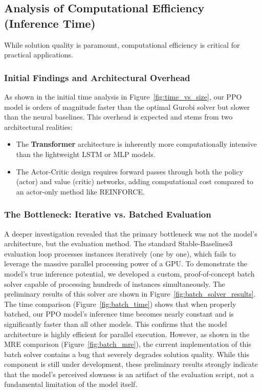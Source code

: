 \subsection{Analysis of Computational Efficiency (Inference Time)}
While solution quality is paramount, computational efficiency is critical for practical applications.

\subsubsection{Initial Findings and Architectural Overhead}
As shown in the initial time analysis in Figure~\ref{fig:time_vs_size}, our PPO model is orders of magnitude faster than the optimal Gurobi solver but slower than the neural baselines.
This overhead is expected and stems from two architectural realities:
\begin{itemize}
    \item The \textbf{Transformer} architecture is inherently more computationally intensive than the lightweight LSTM or MLP models.
    \item The Actor-Critic design requires forward passes through both the policy (actor) and value (critic) networks, adding computational cost compared to an actor-only method like REINFORCE.
\end{itemize}

\subsubsection{The Bottleneck: Iterative vs. Batched Evaluation}
A deeper investigation revealed that the primary bottleneck was not the model's architecture, but the evaluation method.
The standard Stable-Baselines3 evaluation loop processes instances iteratively (one by one), which fails to leverage the massive parallel processing power of a GPU.
To demonstrate the model's true inference potential, we developed a custom, proof-of-concept batch solver capable of processing hundreds of instances simultaneously.
The preliminary results of this solver are shown in Figure~\ref{fig:batch_solver_results}.
The time comparison (Figure~\ref{fig:batch_time}) shows that when properly batched, our PPO model's inference time becomes nearly constant and is significantly faster than all other models.
This confirms that the model architecture is highly efficient for parallel execution.
However, as shown in the MRE comparison (Figure~\ref{fig:batch_mre}), the current implementation of this batch solver contains a bug that severely degrades solution quality.
While this component is still under development, these preliminary results strongly indicate that the model's perceived slowness is an artifact of the evaluation script, not a fundamental limitation of the model itself.

